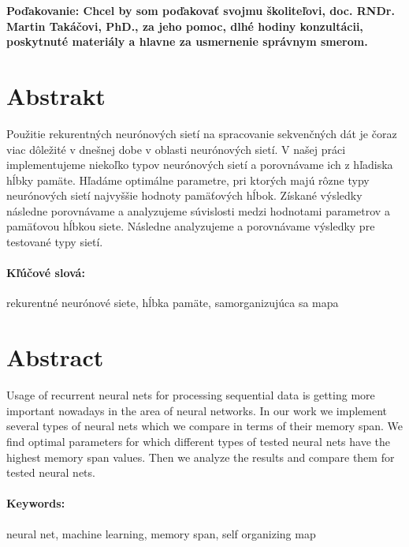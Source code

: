 \documentclass[12pt, oneside]{book}
\begin{document}
 \vfill
 {\bf Poďakovanie: Chcel by som poďakovať svojmu školiteľovi, doc. RNDr. Martin Takáčovi, PhD., za jeho 
 pomoc, dlhé hodiny konzultácii, poskytnuté materiály a hlavne za usmernenie správnym smerom. }




\newpage 
\section*{Abstrakt}
Použitie rekurentných neurónových sietí na spracovanie
sekvenčných dát je čoraz viac dôležité v dnešnej dobe v oblasti neurónových sietí.
V našej práci implementujeme niekoľko typov neurónových sietí a porovnávame ich z hľadiska hĺbky pamäte.
Hľadáme optimálne parametre, pri ktorých majú rôzne typy neurónových sietí najvyššie hodnoty pamäťových hĺbok.
Získané výsledky následne porovnávame a analyzujeme súvislosti medzi hodnotami parametrov a pamäťovou hĺbkou siete. 
Následne analyzujeme a porovnávame výsledky pre testované typy sietí.

\paragraph*{Kľúčové slová:} rekurentné neurónové siete, hĺbka pamäte, samorganizujúca sa mapa


\newpage 
\section*{Abstract}
Usage of recurrent neural nets for processing sequential data is getting more important nowadays in the area of neural networks.
In our work we implement several types of neural nets which we compare in terms of their memory span.
We find optimal parameters for which different types of tested neural nets have the highest memory span values.
Then we analyze the results and compare them for tested neural nets.


\paragraph*{Keywords:} neural net, machine learning, memory span, self organizing map


%
%
\end{document}
